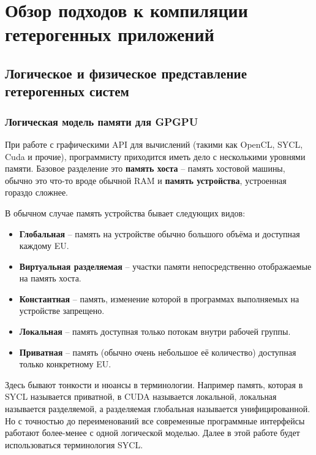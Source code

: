 \chapter{Обзор подходов к компиляции гетерогенных приложений}\label{ch:overview}

\section{Логическое и физическое представление гетерогенных систем}\label{sec:overview/logical}

\subsection{Логическая модель памяти для GPGPU}\label{subsec:overview/logical/memory}

При работе с графическими API для вычислений (такими как OpenCL, SYCL, Cuda и прочие), программисту приходится иметь дело с несколькими уровнями памяти.
Базовое разделение это \textbf{память хоста} -- память хостовой машины, обычно это что-то вроде обычной RAM и \textbf{память устройства}, устроенная гораздо сложнее.

В обычном случае память устройства бывает следующих видов:

\begin{itemize}
\item \textbf{Глобальная} -- память на устройстве обычно большого объёма и доступная каждому EU.
\item \textbf{Виртуальная разделяемая} -- участки памяти непосредственно отображаемые на память хоста.
\item \textbf{Константная} -- память, изменение которой в программах выполняемых на устройстве запрещено.
\item \textbf{Локальная} -- память доступная только потокам внутри рабочей группы.
\item \textbf{Приватная} -- память (обычно очень небольшое её количество) доступная только конкретному EU.
\end{itemize}

Здесь бывают тонкости и нюансы в терминологии. Например память, которая в SYCL называется приватной, в CUDA называется локальной, локальная называется разделяемой, а разделяемая глобальная называется унифицированной. Но с точностью до переименований все современные программные интерфейсы работают более-менее с одной логической моделью. Далее в этой работе будет использоваться терминология SYCL.

